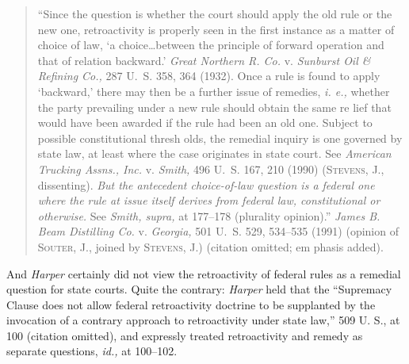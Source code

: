 {\begin{quote}
		\noindent ``Since the question is whether the court should apply the old rule or the new one, retroactivity is properly seen in the first instance as a matter of choice of law, ‘a choice\dots between the principle of forward operation and that of relation backward.' \emph{Great Northern R. Co.} v. \emph{Sunburst Oil \& Refining Co.,} 287 U.~S. 358, 364 (1932). Once a rule is found to apply ‘backward,' there may then be a further issue of remedies, \emph{i. e.,} whether the party prevailing under a new rule should obtain the same re lief that would have been awarded if the rule had been an old one. Subject to possible constitutional thresh olds, the remedial inquiry is one governed by state law, \newpage  at least where the case originates in state court. See \emph{American Trucking Assns., Inc.} v. \emph{Smith,} 496 U.~S. 167, 210 (1990) (\textsc{Stevens,} J., dissenting). \emph{But the antecedent choice-of-law question is a federal one where the rule at issue itself derives from federal law, constitutional or otherwise.} See \emph{Smith, supra,} at 177--178 (plurality opinion).'' \emph{James B. Beam Distilling Co.} v. \emph{Georgia,} 501 U.~S. 529, 534--535 (1991) (opinion of \textsc{Souter,} J., joined by \textsc{Stevens,} J.) (citation omitted; em phasis added).

    \end{quote}

  And \emph{Harper} certainly did not view the retroactivity of federal rules as a remedial question for state courts. Quite the contrary: \emph{Harper} held that the ``Supremacy Clause does not allow federal retroactivity doctrine to be supplanted by the invocation of a contrary approach to retroactivity under state law,'' 509 U. S., at 100 (citation omitted), and expressly treated retroactivity and remedy as separate questions, \emph{id.,} at 100--102.

}

